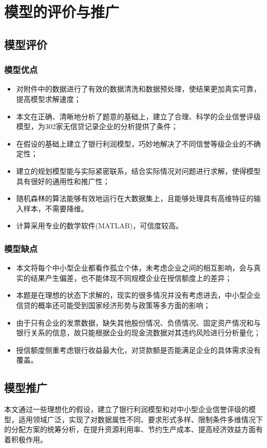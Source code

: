 \documentclass[withoutpreface,bwprint]{cumcmthesis} %
\begin{document}
\section{模型的评价与推广}
\subsection{模型评价}
\subsubsection{模型优点}
\begin{itemize}
	\item 对附件中的数据进行了有效的数据清洗和数据预处理，使结果更加真实可靠，提高模型求解速度；
	\item 本文在正确、清晰地分析了题意的基础上，建立了合理、科学的企业信誉评级模型，为302家无信贷记录企业的分析提供了条件；
	\item 在假设的基础上建立了银行利润模型，巧妙地解决了不同信誉等级企业的不确定性；
	\item 建立的规划模型能与实际紧密联系，结合实际情况对问题进行求解，使得模型具有很好的通用性和推广性；
	\item 随机森林的算法能够有效地运行在大数据集上，且能够处理具有高维特征的输入样本，不需要降维。
	\item 计算采用专业的数学软件(MATLAB)，可信度较高。
\end{itemize}

\subsubsection{模型缺点}
\begin{itemize}
	\item 本文将每个中小型企业都看作孤立个体，未考虑企业之间的相互影响，会与真实的结果产生偏差，也不能体现不同规模企业在授信额度上的差异；
	\item 本题是在理想的状态下求解的，现实的很多情况并没有考虑进去，中小型企业信贷的概率还可能受到国家经济形势与政策等多方面的影响；
	\item 由于只有企业的发票数据，缺失其他股份情况、负债情况、固定资产情况和与银行关系的信息，故只能根据企业的现金流数据对其违约风险进行分析量化；
	\item 授信额度侧重考虑银行收益最大化，对贷款额是否能满足企业的具体需求没有覆盖。
\end{itemize}

\subsection{模型推广}
本文通过一些理想化的假设，建立了银行利润模型和对中小型企业信誉评级的模型，适用领域广泛，实现了对数据属性不同、要求形式多样、限制条件多维情况下的分配方案的统筹分析，在提升资源利用率、节约生产成本、提高经济效益方面有着积极作用。
\end{document}
